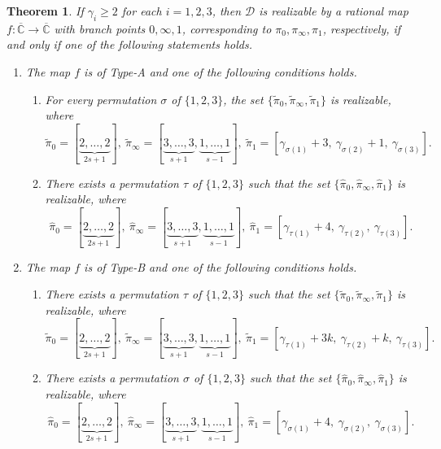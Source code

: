 \documentclass[10pt,a4paper]{amsart}
\newtheorem{thm}{Theorem}
\begin{document}
\begin{thm}\label{MThm2}
If \(\gamma_i \ge 2\) for each \(i=1,2,3\), then \(\mathcal D\) is realizable by a rational map \(f:\overline{\mathbb{C}}\to \overline{\mathbb{C}}\) with branch points \(0,\infty,1\), corresponding to \(\pi_0,\pi_\infty,\pi_1\), respectively, if and only if one of the following statements holds.

\begin{enumerate}
\item[(A)] The map \(f\) is of Type-A and one of the following conditions holds.
\begin{enumerate}
\item[(A-1)] For every permutation \(\sigma\) of \(\{1,2,3\}\), the set \(\{\widetilde{\pi}_0,\widetilde{\pi}_\infty,\widetilde{\pi}_1\}\) is realizable, where
\[
\widetilde{\pi}_0=[\underbrace{2,\ldots,2}_{2s+1}],~
\widetilde{\pi}_\infty=[\underbrace{3,\ldots,3}_{s+1},\underbrace{1,\ldots,1}_{s-1}],~
\widetilde{\pi}_1=[\gamma_{\sigma(1)}+3,\ \gamma_{\sigma(2)}+1,\ \gamma_{\sigma(3)}].
\]
\item[(A-2)] There exists a permutation \(\tau\) of \(\{1,2,3\}\) such that the set \(\{\widehat{\pi}_0,\widehat{\pi}_\infty,\widehat{\pi}_1\}\) is realizable, where
\[
\widehat{\pi}_0=[\underbrace{2,\ldots,2}_{2s+1}],~
\widehat{\pi}_\infty=[\underbrace{3,\ldots,3}_{s+1},\underbrace{1,\ldots,1}_{s-1}],~
\widehat{\pi}_1=[\gamma_{\tau(1)}+4,\ \gamma_{\tau(2)},\ \gamma_{\tau(3)}].
\]
\end{enumerate}

\item[(B)] The map \(f\) is of Type-B and one of the following conditions holds.
\begin{enumerate}
\item[(B-1)] There exists a permutation \(\tau\) of \(\{1,2,3\}\) such that the set \(\{\widetilde{\pi}_0,\widetilde{\pi}_\infty,\widetilde{\pi}_1\}\) is realizable, where
\[
\widetilde{\pi}_0=[\underbrace{2,\ldots,2}_{2s+1}],~
\widetilde{\pi}_\infty=[\underbrace{3,\ldots,3}_{s+1},\underbrace{1,\ldots,1}_{s-1}],~
\widetilde{\pi}_1=[\gamma_{\tau(1)}+3k,\ \gamma_{\tau(2)}+k,\ \gamma_{\tau(3)}].
\]
\item[(B-2)] There exists a permutation \(\sigma\) of \(\{1,2,3\}\) such that the set \(\{\widehat{\pi}_0,\widehat{\pi}_\infty,\widehat{\pi}_1\}\) is realizable, where
\[
\widehat{\pi}_0=[\underbrace{2,\ldots,2}_{2s+1}],~
\widehat{\pi}_\infty=[\underbrace{3,\ldots,3}_{s+1},\underbrace{1,\ldots,1}_{s-1}],~
\widehat{\pi}_1=[\gamma_{\sigma(1)}+4,\ \gamma_{\sigma(2)},\ \gamma_{\sigma(3)}].
\]
\end{enumerate}
\end{enumerate}
\end{thm}
\end{document}
